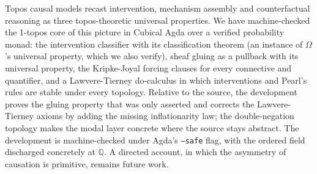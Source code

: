 \documentclass{lmcs}
\newcommand{\Om}{\Omega}
\begin{document}
Topos causal models recast intervention, mechanism assembly and counterfactual reasoning as three topos-theoretic universal properties.
We have machine-checked the 1-topos core of this picture in Cubical Agda over a verified probability monad: the intervention classifier with its classification theorem (an instance of $\Om$'s universal property, which we also verify), sheaf gluing as a pullback with its universal property, the Kripke-Joyal forcing clauses for every connective and quantifier, and a Lawvere-Tierney do-calculus in which interventions and Pearl's rules are stable under every topology.
Relative to the source, the development proves the gluing property that was only asserted and corrects the Lawvere-Tierney axioms by adding the missing inflationarity law; the double-negation topology makes the modal layer concrete where the source stays abstract.
The development is machine-checked under Agda's \texttt{--safe} flag, with the ordered field discharged concretely at $\mathbb{Q}$. A directed account, in which the asymmetry of causation is primitive, remains future work.



\end{document}
